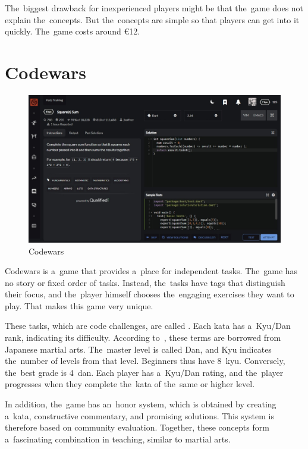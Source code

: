 The~biggest drawback for inexperienced players might be that the~game does not explain the~concepts.
But the~concepts are simple so that players can get into it quickly.
The~game costs around €12.

\section{Codewars}

\begin{figure}
    \centering
    \includegraphics[width=1\linewidth]{assets/similar-games/codewars.jpeg}
    \caption{Codewars~\cite{a2022_codewars}}
    \label{fig:codewars}
\end{figure}

Codewars is a~game that provides a~place for independent tasks.
The~game has no story or fixed order of tasks.
Instead, the~tasks have tags that distinguish their focus, and the~player himself chooses the~engaging exercises they want to play.
That makes this game very unique.

These tasks, which are code challenges, are called .
Each kata has a~Kyu/Dan rank, indicating its difficulty.
According to~\cite{a2022_codewars}, these terms are borrowed from Japanese martial arts.
The~master level is called Dan, and Kyu indicates the~number of levels from that level.
Beginners thus have 8~kyu.
Conversely, the~best grade is 4~dan.
Each player has a~Kyu/Dan rating, and the~player progresses when they complete the~kata of the~same or higher level.

In addition, the~game has an~honor system, which is obtained by creating a~kata, constructive commentary, and promising solutions.
This system is therefore based on community evaluation.
Together, these concepts form a~fascinating combination in teaching, similar to martial arts.


